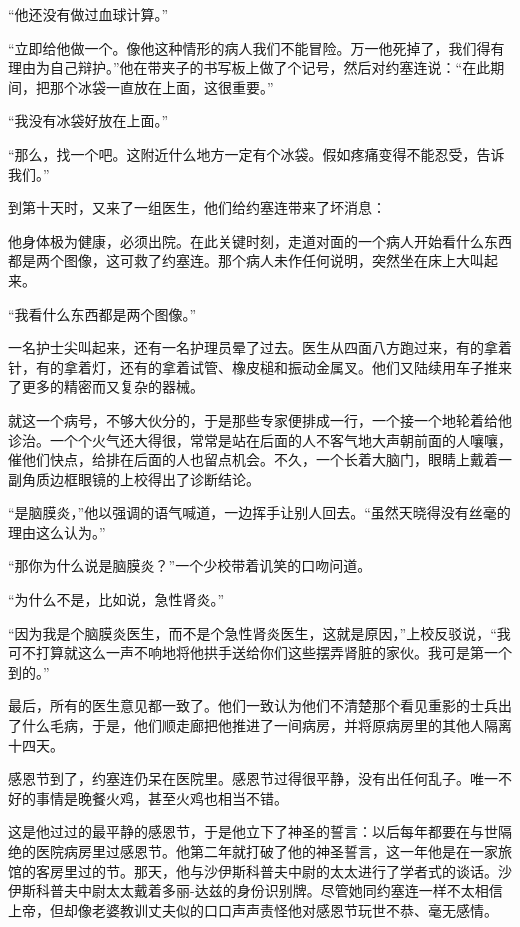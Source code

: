     “他还没有做过血球计算。”

    “立即给他做一个。像他这种情形的病人我们不能冒险。万一他死掉了，我们得有理由为自己辩护。”他在带夹子的书写板上做了个记号，然后对约塞连说：“在此期间，把那个冰袋一直放在上面，这很重要。”

    “我没有冰袋好放在上面。”

    “那么，找一个吧。这附近什么地方一定有个冰袋。假如疼痛变得不能忍受，告诉我们。”

    到第十天时，又来了一组医生，他们给约塞连带来了坏消息：

    他身体极为健康，必须出院。在此关键时刻，走道对面的一个病人开始看什么东西都是两个图像，这可救了约塞连。那个病人未作任何说明，突然坐在床上大叫起来。

    “我看什么东西都是两个图像。”

    一名护士尖叫起来，还有一名护理员晕了过去。医生从四面八方跑过来，有的拿着针，有的拿着灯，还有的拿着试管、橡皮槌和振动金属叉。他们又陆续用车子推来了更多的精密而又复杂的器械。

    就这一个病号，不够大伙分的，于是那些专家便排成一行，一个接一个地轮着给他诊治。一个个火气还大得很，常常是站在后面的人不客气地大声朝前面的人嚷嚷，催他们快点，给排在后面的人也留点机会。不久，一个长着大脑门，眼睛上戴着一副角质边框眼镜的上校得出了诊断结论。

    “是脑膜炎，”他以强调的语气喊道，一边挥手让别人回去。“虽然天晓得没有丝毫的理由这么认为。”

    “那你为什么说是脑膜炎？”一个少校带着讥笑的口吻问道。

    “为什么不是，比如说，急性肾炎。”

    “因为我是个脑膜炎医生，而不是个急性肾炎医生，这就是原因，”上校反驳说，“我可不打算就这么一声不响地将他拱手送给你们这些摆弄肾脏的家伙。我可是第一个到的。”

    最后，所有的医生意见都一致了。他们一致认为他们不清楚那个看见重影的士兵出了什么毛病，于是，他们顺走廊把他推进了一间病房，并将原病房里的其他人隔离十四天。

 


    感恩节到了，约塞连仍呆在医院里。感恩节过得很平静，没有出任何乱子。唯一不好的事情是晚餐火鸡，甚至火鸡也相当不错。

    这是他过过的最平静的感恩节，于是他立下了神圣的誓言：以后每年都要在与世隔绝的医院病房里过感恩节。他第二年就打破了他的神圣誓言，这一年他是在一家旅馆的客房里过的节。那天，他与沙伊斯科普夫中尉的太太进行了学者式的谈话。沙伊斯科普夫中尉太太戴着多丽-达兹的身份识别牌。尽管她同约塞连一样不太相信上帝，但却像老婆教训丈夫似的口口声声责怪他对感恩节玩世不恭、毫无感情。

